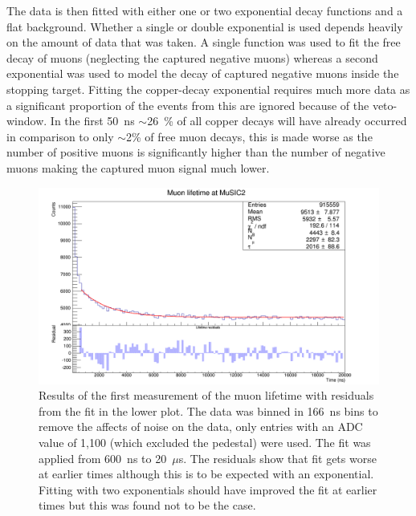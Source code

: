 The data is then fitted with either one or two exponential decay functions and a flat background. Whether a single or double exponential is used depends heavily on the amount of data that was taken. A single function was used to fit the free decay of muons (neglecting the captured negative muons) whereas a second exponential was used to model the decay of captured negative muons inside the stopping target. Fitting the copper-decay exponential requires much more data as a significant proportion of the events from this are ignored because of the veto-window. In the first 50~ns \(\sim\)26~\% of all copper decays will have already occurred in comparison to only \(\sim\)2\% of free muon decays, this is made worse as the number of positive muons is significantly higher than the number of negative muons making the captured muon signal much lower.

\begin{figure}[hptb]
  \centering
  \includegraphics[width=.9\textwidth]{images/lifetime/music2_mu_lifetime_good.png}
  \caption{Results of the first measurement of the muon lifetime with residuals from the fit in the lower plot. The data was binned in 166~ns bins to remove the affects of noise on the data, only entries with an ADC value of 1,100 (which excluded the pedestal) were used. The fit was applied from 600~ns to 20~\(\mu\)s. The residuals show that fit gets worse at earlier times although this is to be expected with an exponential. Fitting with two exponentials should have improved the fit at earlier times but this was found not to be the case.}
  \label{fig:music2_mu_lifetime}
\end{figure}

